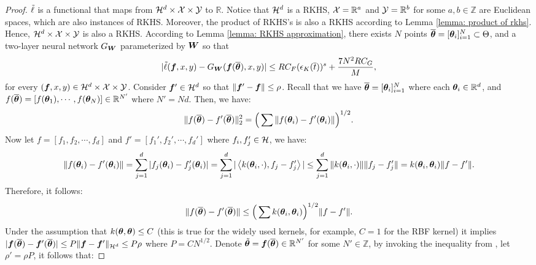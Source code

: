 \begin{proof}

$\Tilde{\ell}$ is a functional that maps from ${\mathcal{H}}^d \times {\mathcal{X}} \times {\mathcal{Y}}$ to $\mathbb{R}$. Notice that ${\mathcal{H}}^d$ is a RKHS, ${\mathcal{X}} = \mathbb{R}^a$ and ${\mathcal{Y}} = \mathbb{R}^b$ for some $a, b \in \mathbb{Z}$ are Euclidean spaces, which are also instances of RKHS. Moreover, the product of RKHS's is also a RKHS according to Lemma \ref{lemma: product of rkhs}. Hence, ${\mathcal{H}}^d \times {\mathcal{X}} \times {\mathcal{Y}}$ is also a RKHS. According to Lemma \ref{lemma: RKHS approximation}, there exists $N$ points $\overline{{\bm{\theta}}} = [{\bm{\theta}}_i]^N_{i = 1} \subset \Theta$, and a two-layer neural network $G_{\bm{W}}$ parameterized by ${\bm{W}}$ so that
\begin{equation*}
    |\Tilde{\ell}({\bm{f}}, x, y) - G_{\bm{W}}({\bm{f}}(\overline{{\bm{\theta}}}), x, y)| \leq  RC_F(\epsilon_K(\overline{t}))^s + \frac{7N^2R C_G}{M},
    \end{equation*}
    for every $({\bm{f}}, x, y) \in {\mathcal{H}}^d \times {\mathcal{X}} \times {\mathcal{Y}}$.  Consider ${\bm{f}}' \in {\mathcal{H}}^d$ so that $\|{\bm{f}}' - {\bm{f}}\| \leq \rho$. Recall that we have $\overline{{\bm{\theta}}} = [{\bm{\theta}}_i]_{i=1}^N$ where each ${\bm{\theta}}_i \in \mathbb{R}^d$, and $f(\overline{{\bm{\theta}}}) = [f({\bm{\theta}}_1), \cdots, f({\bm{\theta}}_N)] \in \mathbb{R}^{N'}$ where $N' =Nd$. Then, we have:
    \begin{equation*}
        \|f(\overline{{\bm{\theta}}}) - f'(\overline{{\bm{\theta}}})\|^2_2 = \Big(\sum \|f({\bm{\theta}}_i) - f'({\bm{\theta}}_i)\|\Big)^{1/2}.
    \end{equation*}
    Now let $f= [f_1, f_2, \cdots, f_d]$ and $f' = [f_1', f_2', \cdots, f_d']$ where $f_i, f'_j \in {\mathcal{H}}$, we have:
    \begin{equation*}
        \|f({\bm{\theta}}_i) - f'({\bm{\theta}}_i)\| = \sum^d_{j=1} |f_j({\bm{\theta}}_i) - f'_j({\bm{\theta}}_i)| = \sum^d_{j=1}|\left<k({\bm{\theta}}_i, \cdot), f_j - f'_j \right>| \leq \sum^d_{j=1}\|k({\bm{\theta}}_i, \cdot)\| \|f_j - f'_j\| = k({\bm{\theta}}_i, {\bm{\theta}}_i)\|f - f'\|.
    \end{equation*}
    Therefore, it follows:
    \begin{equation*}
        \|f(\overline{{\bm{\theta}}}) - f'(\overline{{\bm{\theta}}})\| \leq \Big( \sum k({\bm{\theta}}_i, {\bm{\theta}}_i)\Big)^{1/2} \|f - f'\|.
    \end{equation*}
    Under the assumption that $k({\bm{\theta}}, {\bm{\theta}}) \leq C$ (this is true for the widely used kernels, for example, $C = 1$ for the RBF kernel) it implies $   |{\bm{f}}(\overline{{\bm{\theta}}}) - {\bm{f}}'(\overline{{\bm{\theta}}})| \leq P \| {\bm{f}} - {\bm{f}}'\|_{{\mathcal{H}}^d} \leq P\rho$ where $P = CN^{1/2}$. Denote $\Tilde{{\bm{\theta}}} = {\bm{f}}(\overline{{\bm{\theta}}}) \in \mathbb{R}^{N'}$ for some $N' \in \mathbb{Z}$, by invoking the inequality from \cite{sam}, let $\rho' = \rho P$, it follows that: 
    

\end{proof}
